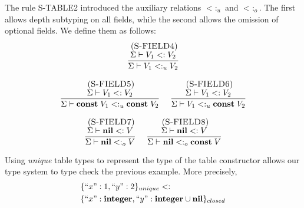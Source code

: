 \documentclass{sigplanconf}
\newcommand{\Nil}{\mathbf{nil}}
\newcommand{\Integer}{\mathbf{integer}}
\newcommand{\Const}{\mathbf{const}}
\newcommand{\mylabel}[1]{\; (\textsc{#1})}
\newcommand{\senv}{\Sigma}
\newcommand{\subtype}{<:}
\begin{document}
The rule \textsc{S-TABLE2} introduced the auxiliary relations
$\subtype_{u}$ and $\subtype_{o}$.
The first allows depth subtyping on all fields,
while the second allows the omission of optional fields.
We define them as follows:
\[
\begin{array}{c}
\begin{array}{c}
\mylabel{S-FIELD4}\\
\dfrac{\senv \vdash V_{1} \subtype V_{2}}
      {\senv \vdash V_{1} \subtype_{u} V_{2}}
\end{array}
\\ \\
\begin{array}{c}
\mylabel{S-FIELD5}\\
\dfrac{\senv \vdash V_{1} \subtype V_{2}}
      {\senv \vdash \Const \; V_{1} \subtype_{u} \Const \; V_{2}}
\end{array}
\;
\begin{array}{c}
\mylabel{S-FIELD6}\\
\dfrac{\senv \vdash V_{1} \subtype V_{2}}
      {\senv \vdash V_{1} \subtype_{u} \Const \; V_{2}}
\end{array}
\\ \\
\begin{array}{c}
\mylabel{S-FIELD7}\\
\dfrac{\senv \vdash \Nil \subtype V}
      {\senv \vdash \Nil \subtype_{o} V}
\end{array}
\;
\begin{array}{c}
\mylabel{S-FIELD8}\\
\dfrac{\senv \vdash \Nil \subtype V}
      {\senv \vdash \Nil \subtype_{o} \Const \; V}
\end{array}
\end{array}
\]

Using \emph{unique} table types to represent the type of the table
constructor allows our type system to type check the previous example.
More precisely,
\begin{align*}
& \{``x":1, ``y":2\}_{unique} \subtype \\
& \{``x":\Integer, ``y":\Integer \cup \Nil\}_{closed}
\end{align*}
\end{document}
